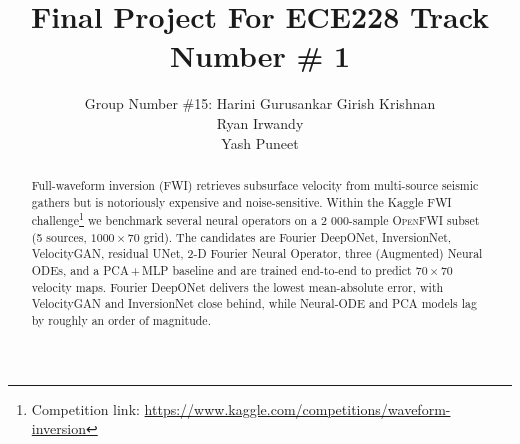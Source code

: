 \documentclass{article}
\title{Final Project For ECE228 Track Number \# 1}
\author{%
  Group Number \#15: Harini Gurusankar
  \And
  Girish Krishnan \\
  \AND
  Ryan Irwandy  \\
  \And
  Yash Puneet \\
}
\begin{document}
\maketitle

\begin{abstract}
    Full-waveform inversion (FWI) retrieves subsurface velocity from multi-source seismic gathers but is notoriously expensive and noise-sensitive.   Within the Kaggle FWI challenge\footnote{Competition link: \url{https://www.kaggle.com/competitions/waveform-inversion}} we benchmark several neural operators on a 2 000-sample \textsc{OpenFWI} subset (5 sources, $1000\times70$ grid).  
    The candidates are Fourier DeepONet, InversionNet, VelocityGAN, residual UNet, 2-D Fourier Neural Operator, three (Augmented) Neural ODEs, and a PCA\,+\,MLP baseline and are trained end-to-end to predict $70\times70$ velocity maps.  
    Fourier DeepONet delivers the lowest mean-absolute error, with VelocityGAN and InversionNet close behind, while Neural-ODE and PCA models lag by roughly an order of magnitude.  
\end{abstract}


\end{document}
